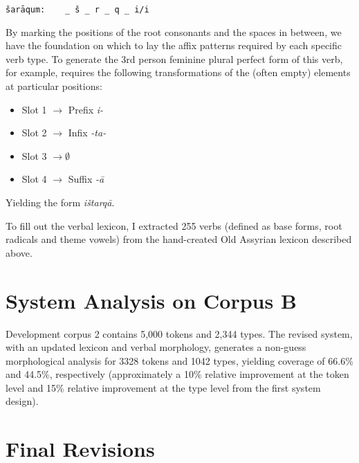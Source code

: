 \documentclass[11pt,letterpaper]{article}
\begin{document}
\begin{verbatim}
šarāqum:	_ š _ r _ q _ i/i
\end{verbatim}



By marking the positions of the root consonants and the spaces in between, we have the foundation on which to lay the affix patterns required by each specific verb type. To generate the 3rd person feminine plural perfect form of this verb, for example, requires the following transformations of the (often empty) elements at particular positions:

\begin{itemize}
\item Slot 1 $\rightarrow$ Prefix \emph{i-}
\item Slot 2 $\rightarrow$ Infix \emph{-ta-}
\item Slot 3 $\rightarrow \emptyset$
\item Slot 4 $\rightarrow$ Suffix \emph{-ā}
\end{itemize}

Yielding the form \emph{ištarqā}.


To fill out the verbal lexicon, I extracted 255 verbs (defined as base forms, root radicals and theme vowels) from the hand-created Old Assyrian  lexicon described above.

\section{System Analysis on Corpus B}

Development corpus 2 contains 5,000 tokens and 2,344 types. The revised system, with an updated lexicon and verbal morphology, generates a non-guess morphological analysis for 3328 tokens and 1042 types, yielding coverage of 66.6\% and 44.5\%, respectively (approximately a 10\% relative improvement at the token level and 15\% relative improvement at the type level from the first system design).

\section{Final Revisions}
\end{document}
